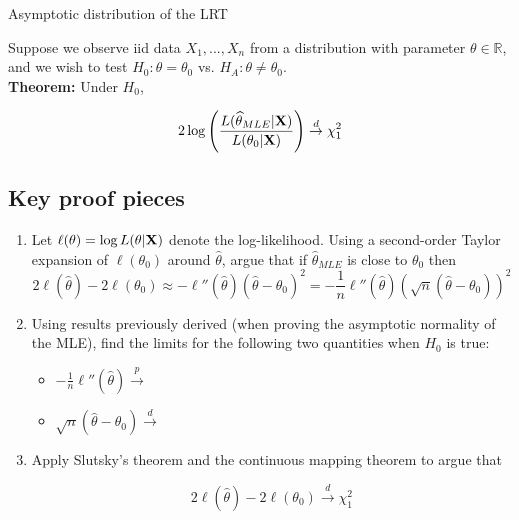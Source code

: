\documentclass[11pt]{article}
\begin{document}
\begin{center}
\Large
Asymptotic distribution of the LRT \\
\normalsize
\vspace{5mm}
\end{center}

\noindent Suppose we observe iid data $X_1,...,X_n$ from a distribution with parameter $\theta \in \mathbb{R}$, and we wish to test $H_0: \theta = \theta_0$ vs. $H_A: \theta \neq \theta_0$.\\

\noindent \textbf{Theorem:} Under $H_0$,

$$2 \log \left( \frac{L(\widehat{\theta}_{MLE} | {\bf X})}{L(\theta_0 | {\bf X})} \right) \overset{d}{\to} \chi^2_1$$

\subsection*{Key proof pieces}

\begin{enumerate}
\item Let $\ell(\theta) = \log L(\theta | {\bf X})$ denote the log-likelihood. Using a second-order Taylor expansion of $\ell(\theta_0)$ around $\widehat{\theta}$, argue that if $\widehat{\theta}_{MLE}$ is close to $\theta_0$ then
$$2 \ell(\widehat{\theta}) - 2 \ell(\theta_0) \approx -\ell''(\widehat{\theta})(\widehat{\theta} - \theta_0)^2 = -\frac{1}{n} \ell''(\widehat{\theta}) (\sqrt{n}(\widehat{\theta} - \theta_0) )^2$$

\vspace{7cm}

\item Using results previously derived (when proving the asymptotic normality of the MLE), find the limits for the following two quantities when $H_0$ is true:

\begin{itemize}
\item $-\frac{1}{n} \ell''(\widehat{\theta}) \overset{p}{\to}$
\bigskip
\item $\sqrt{n}(\widehat{\theta} - \theta_0) \overset{d}{\to}$
\end{itemize}

\newpage


\item Apply Slutsky's theorem and the continuous mapping theorem to argue that

$$2 \ell(\widehat{\theta}) - 2 \ell(\theta_0) \overset{d}{\to} \chi^2_1$$

\end{enumerate}
\end{document}
